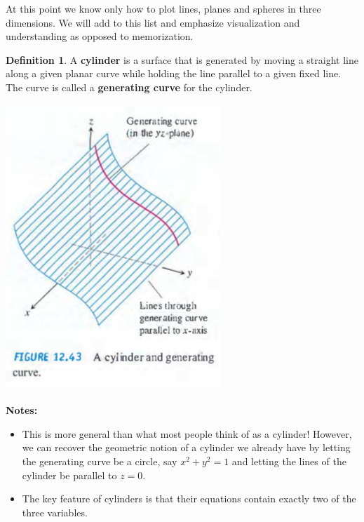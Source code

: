 \documentclass[12pt, letter]{article}
\theoremstyle{plain}
\numberwithin{theorem}{section}
\theoremstyle{definition}
\newtheorem{definition}[theorem]{Definition}
\begin{document}
At this point we know only how to plot lines, planes and spheres in three dimensions. We will add to this list and emphasize visualization and understanding as opposed to memorization.

\bigskip

\begin{definition}
A \textbf{cylinder} is a surface that is generated by moving a straight line along a given planar curve while holding the line parallel to a given fixed line. The curve is called a \textbf{generating curve} for the cylinder.
\end{definition}

\bigskip

\begin{center}
\includegraphics[scale=0.7]{m1_f22}
\end{center}

\bigskip

\textbf{Notes:}
\begin{itemize}
\item This is more general than what most people think of as a cylinder! However, we can recover the geometric notion of a cylinder we already have by letting the generating curve be a circle, say $x^2+y^2=1$ and letting the lines of the cylinder be parallel to $z=0$.
\item The key feature of cylinders is that their equations contain exactly two of the three variables.
\end{itemize}

\bigskip
\end{document}
